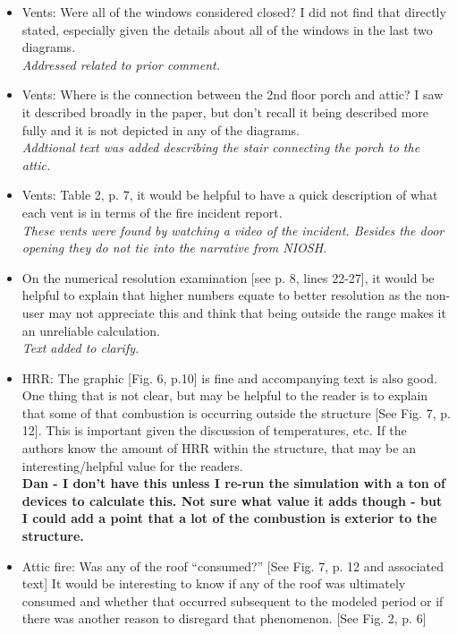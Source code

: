 \documentclass[12pt]{article}
\begin{document}
\begin{itemize}
{\it You are correct in that there were roof ventilation holes that were made. Roof ventilation occured after the interior flow path was established and was not considered in the model.}
\item Vents: Were all of the windows considered closed? I did not find that directly stated, especially given the details about all of the windows in the last two diagrams. \\
{\it Addressed related to prior comment.}
\item Vents: Where is the connection between the 2nd floor porch and attic? I saw it described broadly in the paper, but don't recall it being described more fully and it is not depicted in any of the diagrams. \\
{\it Addtional text was added describing the stair connecting the porch to the attic.}
\item Vents: Table 2, p. 7, it would be helpful to have a quick description of what each vent is in terms of the fire incident report. \\
{\it These vents were found by watching a video of the incident. Besides the door opening they do not tie into the narrative from NIOSH.}
\item On the numerical resolution examination [see p. 8, lines 22-27], it would be helpful to explain that higher numbers equate to better resolution as the non-user may not appreciate this and think that being outside the range makes it an unreliable calculation. \\
{\it Text added to clarify.}
\item HRR: The graphic [Fig. 6, p.10] is fine and accompanying text is also good. One thing that is not clear, but may be helpful to the reader is to explain that some of that combustion is occurring outside the structure [See Fig. 7, p. 12]. This is important given the discussion of temperatures, etc. If the authors know the amount of HRR within the structure, that may be an interesting/helpful value for the readers. \\
{\bf Dan - I don't have this unless I re-run the simulation with a ton of devices to calculate this. Not sure what value it adds though - but I could add a point that a lot of the combustion is exterior to the structure.}
\item Attic fire: Was any of the roof ``consumed?'' [See Fig. 7, p. 12 and associated text] It would be interesting to know if any of the roof was ultimately consumed and whether that occurred subsequent to the modeled period or if there was another reason to disregard that phenomenon. [See Fig. 2, p. 6]\\

\end{itemize}
\end{document}
